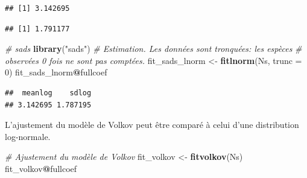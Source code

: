 \documentclass[
  11pt,
  french,
  a4paper,
  extrafontsizes,onecolumn,openright
  ]{memoir}
\newenvironment{Shaded}{\begin{snugshade}}{\end{snugshade}}
\newcommand{\CommentTok}[1]{\textcolor[rgb]{0.56,0.35,0.01}{\textit{#1}}}
\newcommand{\DataTypeTok}[1]{\textcolor[rgb]{0.13,0.29,0.53}{#1}}
\newcommand{\DecValTok}[1]{\textcolor[rgb]{0.00,0.00,0.81}{#1}}
\newcommand{\KeywordTok}[1]{\textcolor[rgb]{0.13,0.29,0.53}{\textbf{#1}}}
\newcommand{\NormalTok}[1]{#1}
\newcommand{\OperatorTok}[1]{\textcolor[rgb]{0.81,0.36,0.00}{\textbf{#1}}}
\newcommand{\StringTok}[1]{\textcolor[rgb]{0.31,0.60,0.02}{#1}}
\begin{document}
\scriptsize

\begin{Shaded}
\end{Shaded}

\begin{verbatim}
## [1] 3.142695
\end{verbatim}

\begin{Shaded}
\end{Shaded}

\begin{verbatim}
## [1] 1.791177
\end{verbatim}

\begin{Shaded}
\begin{Highlighting}[]
\CommentTok{# sads}
\KeywordTok{library}\NormalTok{(}\StringTok{"sads"}\NormalTok{)}
\CommentTok{# Estimation. Les données sont tronquées: les espèces}
\CommentTok{# observées 0 fois ne sont pas comptées.}
\NormalTok{fit_sads_lnorm <-}\StringTok{ }\KeywordTok{fitlnorm}\NormalTok{(Ns, }\DataTypeTok{trunc =} \DecValTok{0}\NormalTok{)}
\NormalTok{fit_sads_lnorm}\OperatorTok{@}\NormalTok{fullcoef}
\end{Highlighting}
\end{Shaded}

\begin{verbatim}
##  meanlog    sdlog 
## 3.142695 1.787195
\end{verbatim}

\normalsize

L'ajustement du modèle de Volkov peut être comparé à celui d'une distribution log-normale.

\scriptsize

\begin{Shaded}
\begin{Highlighting}[]
\CommentTok{# Ajustement du modèle de Volkov}
\NormalTok{fit_volkov <-}\StringTok{ }\KeywordTok{fitvolkov}\NormalTok{(Ns)}
\NormalTok{fit_volkov}\OperatorTok{@}\NormalTok{fullcoef}
\end{Highlighting}
\end{Shaded}
\end{document}
